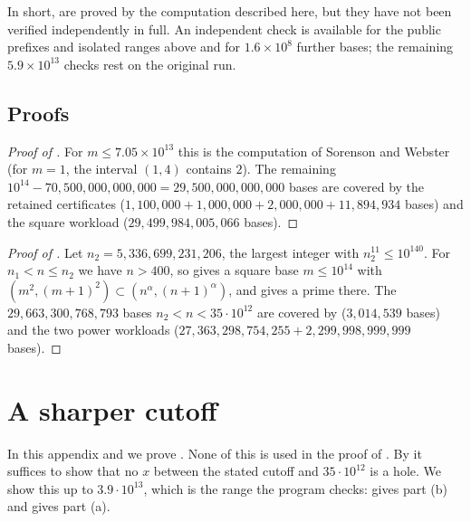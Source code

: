 \documentclass[11pt,colorlinks]{charlie}
\begin{document}
In short,  are proved by the computation described here, but they have not been verified independently in full. An independent check is available for the public prefixes and isolated ranges above and for $1.6\times10^8$ further bases; the remaining $5.9\times10^{13}$ checks rest on the original run.

\subsection{Proofs}
\begin{proof}[Proof of ]
For $m\le7.05\times10^{13}$ this is the computation of Sorenson and Webster \cite{SW} (for $m=1$, the interval $(1,4)$ contains $2$). The remaining $10^{14}-70{,}500{,}000{,}000{,}000=29{,}500{,}000{,}000{,}000$ bases are covered by the retained certificates ($1{,}100{,}000+1{,}000{,}000+2{,}000{,}000+11{,}894{,}934$ bases) and the square workload ($29{,}499{,}984{,}005{,}066$ bases).
\end{proof}

\begin{proof}[Proof of ]
Let $n_2=5{,}336{,}699{,}231{,}206$, the largest integer with $n_2^{11}\le10^{140}$. For $n_1<n\le n_2$ we have $n>400$, so  gives a square base $m\le10^{14}$ with $(m^2,(m+1)^2)\subset(n^\alpha,(n+1)^\alpha)$, and  gives a prime there. The $29{,}663{,}300{,}768{,}793$ bases $n_2<n<35\cdot10^{12}$ are covered by  ($3{,}014{,}539$ bases) and the two power workloads ($27{,}363{,}298{,}754{,}255+2{,}299{,}998{,}999{,}999$ bases).
\end{proof}

\appendix
\section{A sharper cutoff}\label{sec:sharp}
In this appendix and  we prove . None of this is used in the proof of . By  it suffices to show that no $x$ between the stated cutoff and $35\cdot10^{12}$ is a hole. We show this up to $3.9\cdot10^{13}$, which is the range the program checks:  gives part (b) and  gives part (a).
\end{document}
